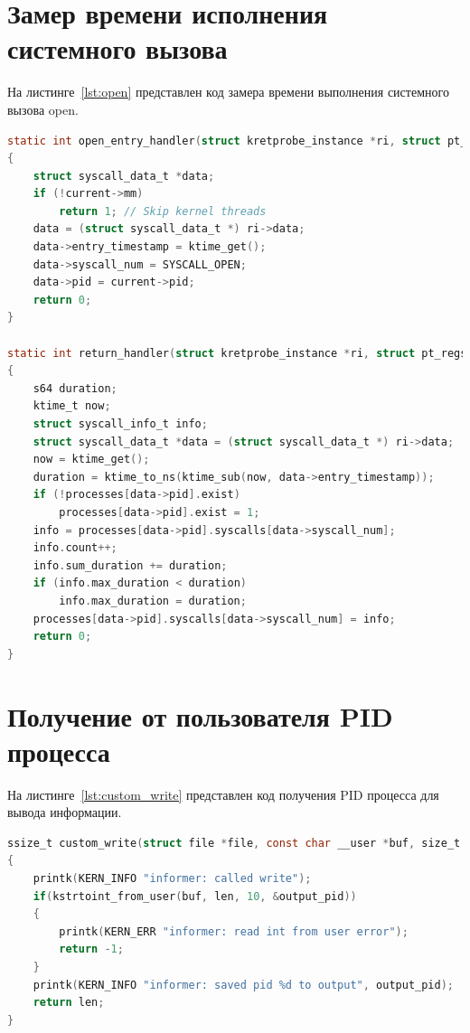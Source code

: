 \section{Замер времени исполнения системного вызова}

На листинге~\ref{lst:open} представлен код замера времени выполнения системного вызова open.

\begin{lstlisting}[language=C, label=lst:open, caption={Замер времени выполнения системного вызова open}]
static int open_entry_handler(struct kretprobe_instance *ri, struct pt_regs *regs)
{
    struct syscall_data_t *data;
    if (!current->mm)
        return 1; // Skip kernel threads
    data = (struct syscall_data_t *) ri->data;
    data->entry_timestamp = ktime_get();
    data->syscall_num = SYSCALL_OPEN;
    data->pid = current->pid;
    return 0;
}

static int return_handler(struct kretprobe_instance *ri, struct pt_regs *regs)
{
    s64 duration;
    ktime_t now;
    struct syscall_info_t info;
    struct syscall_data_t *data = (struct syscall_data_t *) ri->data;
    now = ktime_get();
    duration = ktime_to_ns(ktime_sub(now, data->entry_timestamp));
    if (!processes[data->pid].exist)
        processes[data->pid].exist = 1;
    info = processes[data->pid].syscalls[data->syscall_num];
    info.count++;
    info.sum_duration += duration;
    if (info.max_duration < duration)
        info.max_duration = duration;
    processes[data->pid].syscalls[data->syscall_num] = info;
    return 0;
}
\end{lstlisting}

\section{Получение от пользователя PID процесса}

На листинге~\ref{lst:custom_write} представлен код получения PID процесса для вывода информации.

\begin{lstlisting}[language=C, label=lst:custom_write, caption={Получение PID процесса для вывода информации}]
ssize_t custom_write(struct file *file, const char __user *buf, size_t len, loff_t *offp)
{
    printk(KERN_INFO "informer: called write");
    if(kstrtoint_from_user(buf, len, 10, &output_pid))
    {
        printk(KERN_ERR "informer: read int from user error");
        return -1;
    }
    printk(KERN_INFO "informer: saved pid %d to output", output_pid);
    return len;
}
\end{lstlisting}

